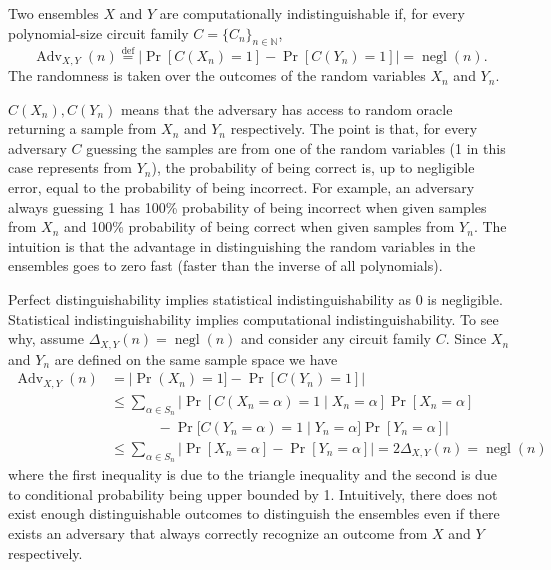 \begin{definition}
    Two ensembles $X$ and $Y$ are computationally indistinguishable if, for every polynomial-size circuit family $C = \{C_n\}_{n \in \mathbb{N}}$, $$\operatorname{Adv}_{X,Y}(n) \stackrel{\mathrm{def}}{=} |\operatorname{Pr}[C(X_n) = 1] - \operatorname{Pr}[C(Y_n) = 1]| = \operatorname{negl}(n).$$
    The randomness is taken over the outcomes of the random variables $X_n$ and $Y_n$.
\end{definition}
$C(X_n), C(Y_n)$ means that the adversary has access to random oracle returning a sample from $X_n$ and $Y_n$ respectively. The point is that, for every adversary $C$ guessing the samples are from one of the random variables (1 in this case represents from $Y_n$), the probability of being correct is, up to negligible error, equal to the probability of being incorrect. For example, an adversary always guessing 1 has 100\% probability of being incorrect when given samples from $X_n$ and 100\% probability of being correct when given samples from $Y_n$. The intuition is that the advantage in distinguishing the random variables in the ensembles goes to zero fast (faster than the inverse of all polynomials).

Perfect distinguishability implies statistical indistinguishability as 0 is negligible. Statistical indistinguishability implies computational indistinguishability. To see why, assume $\Delta_{X,Y}(n) = \operatorname{negl}(n)$ and consider any circuit family $C$. Since $X_n$ and $Y_n$ are defined on the same sample space we have
\begin{equation*}
\begin{aligned}
    \operatorname{Adv}_{X,Y}(n) &= |\operatorname{Pr}(X_n) = 1] - \operatorname{Pr}[C(Y_n) = 1]|\\
        &\leq \sum_{\alpha \in S_n} | \operatorname{Pr}[C(X_n = \alpha) = 1 \; | \; X_n = \alpha]\operatorname{Pr}[X_n = \alpha] \\
        &\phantom{=} \qquad - \operatorname{Pr}[C(Y_n = \alpha) = 1 \; | \; Y_n = \alpha]\operatorname{Pr}[Y_n = \alpha] | \\
        &\leq \sum_{\alpha \in S_n} | \operatorname{Pr}[X_n = \alpha] - \operatorname{Pr}[Y_n = \alpha]| = 2\Delta_{X,Y}(n) = \operatorname{negl}(n)
\end{aligned}
\end{equation*}
where the first inequality is due to the triangle inequality and the second is due to conditional probability being upper bounded by 1. Intuitively, there does not exist enough distinguishable outcomes to distinguish the ensembles even if there exists an adversary that always correctly recognize an outcome from $X$ and $Y$ respectively.

